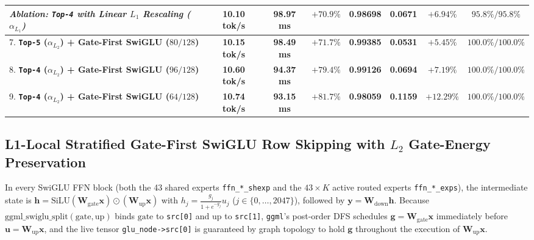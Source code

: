 \documentclass[10pt,twocolumn]{article}
\begin{document}
\begin{table}[t]
{\begin{tabular}{@{}lccccccc@{}}
\midrule
\textit{Ablation: \texttt{Top-4} with Linear $L_1$ Rescaling ($\alpha_{L_1}$)} & 10.10 tok/s & 98.97 ms & $+70.9\%$ & 0.98698 & 0.0671 & $+6.94\%$ & $95.8\% / 95.8\%$ \\
\midrule
7. \textbf{\texttt{Top-5} ($\alpha_{L_2}$) + Gate-First SwiGLU ($80/128$)} & \textbf{10.15 tok/s} & \textbf{98.49 ms} & $\mathbf{+71.7\%}$ & \textbf{0.99385} & \textbf{0.0531} & $\mathbf{+5.45\%}$ & $\mathbf{100.0\% / 100.0\%}$ \\
8. \textbf{\texttt{Top-4} ($\alpha_{L_2}$) + Gate-First SwiGLU ($96/128$)} & \textbf{10.60 tok/s} & \textbf{94.37 ms} & $\mathbf{+79.4\%}$ & \textbf{0.99126} & \textbf{0.0694} & $\mathbf{+7.19\%}$ & $\mathbf{100.0\% / 100.0\%}$ \\
9. \textbf{\texttt{Top-4} ($\alpha_{L_2}$) + Gate-First SwiGLU ($64/128$)} & \textbf{10.74 tok/s} & \textbf{93.15 ms} & $\mathbf{+81.7\%}$ & \textbf{0.98059} & \textbf{0.1159} & $\mathbf{+12.29\%}$ & $\mathbf{100.0\% / 100.0\%}$ \\
\bottomrule
\end{tabular}%
}
\end{table}

\subsection{L1-Local Stratified Gate-First SwiGLU Row Skipping with $L_2$ Gate-Energy Preservation}
In every SwiGLU FFN block (both the 43 shared experts \texttt{ffn\_*\_shexp} and the $43 \times K$ active routed experts \texttt{ffn\_*\_exps}), the intermediate state is $\mathbf{h} = \text{SiLU}(\mathbf{W}_{\text{gate}}\mathbf{x}) \odot (\mathbf{W}_{\text{up}}\mathbf{x})$ with $h_j = \frac{g_j}{1 + e^{-g_j}} u_j$ ($j \in \{0,\dots,2047\}$), followed by $\mathbf{y} = \mathbf{W}_{\text{down}}\mathbf{h}$. Because $\text{ggml\_swiglu\_split}(\text{gate}, \text{up})$ binds $\text{gate}$ to \texttt{src[0]} and $\text{up}$ to \texttt{src[1]}, \texttt{ggml}'s post-order DFS schedules $\mathbf{g} = \mathbf{W}_{\text{gate}}\mathbf{x}$ immediately before $\mathbf{u} = \mathbf{W}_{\text{up}}\mathbf{x}$, and the live tensor \texttt{glu\_node->src[0]} is guaranteed by graph topology to hold $\mathbf{g}$ throughout the execution of $\mathbf{W}_{\text{up}}\mathbf{x}$.
\end{document}
